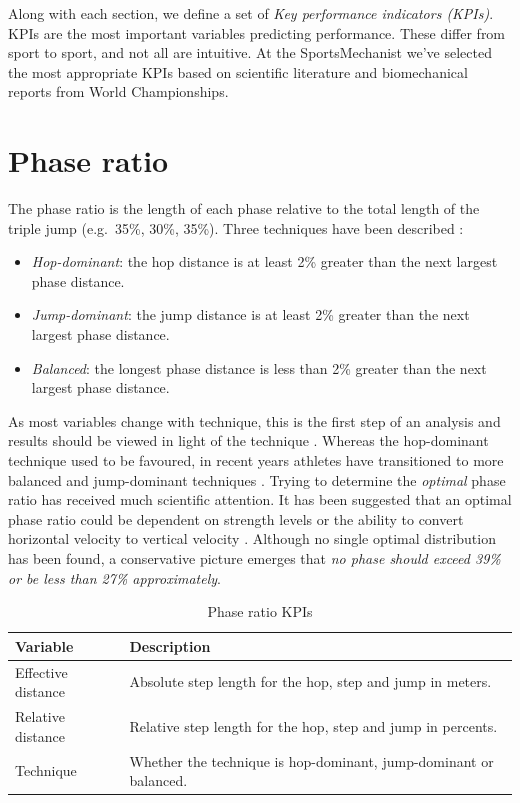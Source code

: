 \documentclass[]{scrreprt}
\providecommand{\tightlist}{%
  \setlength{\itemsep}{0pt}\setlength{\parskip}{0pt}}
\begin{document}
Along with each section, we define a set of \emph{Key performance indicators (KPIs)}. KPIs are the most important variables predicting performance. These differ from sport to sport, and not all are intuitive. At the SportsMechanist we've selected the most appropriate KPIs based on scientific literature and biomechanical reports from World Championships. ~

\clearpage

\hypertarget{phase-ratio}{%
\section{Phase ratio}\label{phase-ratio}}

The phase ratio is the length of each phase relative to the total length of the triple jump (e.g.~35\%, 30\%, 35\%). Three techniques have been described \autocite{Hay1992}:

\begin{itemize}
\tightlist
\item
  \emph{Hop-dominant}: the hop distance is at least 2\% greater than the next largest phase distance.
\item
  \emph{Jump-dominant}: the jump distance is at least 2\% greater than the next largest phase distance.
\item
  \emph{Balanced}: the longest phase distance is less than 2\% greater than the next largest phase distance.
\end{itemize}

As most variables change with technique, this is the first step of an analysis and results should be viewed in light of the technique \autocite{Hay1992}. Whereas the hop-dominant technique used to be favoured, in recent years athletes have transitioned to more balanced and jump-dominant techniques \autocites[e.g.][]{Hay1992}{Tucker2019}.
Trying to determine the \emph{optimal} phase ratio has received much scientific attention. It has been suggested that an optimal phase ratio could be dependent on strength levels or the ability to convert horizontal velocity to vertical velocity \autocites{Allen2013}{Allen2016}{Liu2012}. Although no single optimal distribution has been found, a conservative picture emerges that \emph{no phase should exceed 39\% or be less than 27\% approximately}.~

\begin{longtable}[t]{>{\raggedright\arraybackslash}p{10em}|>{\raggedright\arraybackslash}p{20em}}
\caption{\label{tab:phase-ratio-desc}Phase ratio KPIs}\\
\hline
Variable & Description\\
\hline
Effective distance & Absolute step length for the hop, step and jump in meters.\\
\hline
Relative distance & Relative step length for the hop, step and jump in percents.\\
\hline
Technique & Whether the technique is hop-dominant, jump-dominant or balanced.\\
\hline
\end{longtable}
\end{document}
